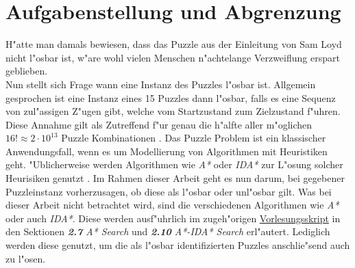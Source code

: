 \section{Aufgabenstellung und Abgrenzung} %
\label{cha:Aufgabenstellung}
H"atte man damals bewiesen, dass das Puzzle aus der Einleitung von Sam Loyd nicht l"osbar ist, w"are wohl vielen Menschen n"achtelange Verzweiflung erspart geblieben.\\
Nun stellt sich Frage wann eine Instanz des Puzzles l"osbar ist. Allgemein gesprochen ist eine Instanz eines 15 Puzzles dann l"osbar, falls es eine Sequenz von zul"assigen Z"ugen gibt, welche vom Startzustand zum Zielzustand f"uhren.\\
Diese Annahme gilt als Zutreffend f"ur genau die h"alfte aller m"oglichen $16! \approx 2 \cdot 10^{13}$ Puzzle Kombinationen \autocite{sliding-piece-puzzels:book,solving-15-puzzle-lvi:article}.
Das Puzzle Problem ist ein klassischer Anwendungsfall, wenn es um Modellierung von Algorithmen mit Heuristiken geht. "Ublicherweise werden Algorithmen wie \textit{A*} oder \textit{IDA*} zur L"osung solcher Heurisiken genutzt \autocite{wiki-15-puzzle:online,solving-15-puzzle-lvi:article, depth-first-id:article}.
Im Rahmen dieser Arbeit geht es nun darum, bei gegebener Puzzleinstanz vorherzusagen, ob diese als l"osbar oder unl"osbar gilt.
Was bei dieser Arbeit nicht betrachtet wird, sind die verschiedenen Algorithmen wie \textit{A*} oder auch \textit{IDA*}. Diese werden ausf"uhrlich im zugeh"origen \textcolor{violet}{\href{https://github.com/karlstroetmann/Artificial-Intelligence/blob/master/Lecture-Notes/artificial-intelligence.pdf}{Vorlesungsskript}} \autocite{github-stroetmann:online} in den Sektionen \textit{\textbf{2.7} A* Search} und \textit{\textbf{2.10} A*-IDA* Search} erl"autert.
Lediglich werden diese genutzt, um die als l"osbar identifizierten Puzzles anschlie"send auch zu l"osen.



